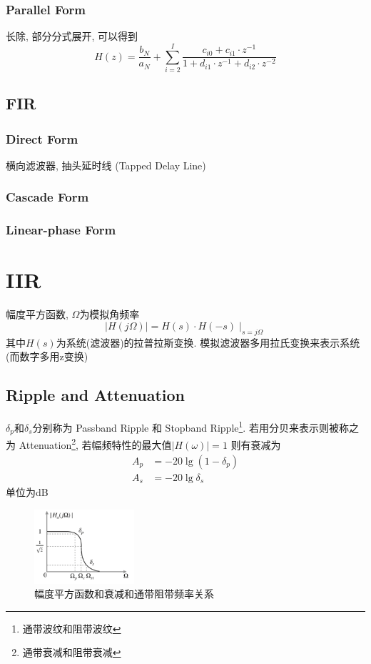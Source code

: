 \documentclass[a4paper]{report}
\begin{document}
\subsection{Parallel Form}
长除, 部分分式展开, 可以得到
\begin{equation}
  H(z)=\frac{b_N}{a_N}+\displaystyle\sum_{i=2}^{I}\frac{c_{i0}+c_{i1}\cdot z^{-1}}{1+d_{i1}\cdot z^{-1}+d_{i2}\cdot z^{-2}}
\end{equation}
\section{FIR}
\subsection{Direct Form}
横向滤波器, 抽头延时线 (Tapped Delay Line)
\subsection{Cascade Form}
\subsection{Linear-phase Form}



\chapter{IIR}
幅度平方函数, $\Omega$为模拟角频率
\begin{equation}
  \lvert H(j\Omega)\rvert=H(s)\cdot H(-s)\mid_{s=j\Omega}
\end{equation}
其中$H(s)$为系统(滤波器)的拉普拉斯变换. 模拟滤波器多用拉氏变换来表示系统(而数字多用z变换)

\section{Ripple and Attenuation}
$\delta_p$和$\delta_s$分别称为 Passband Ripple 和 Stopband Ripple\footnote{通带波纹和阻带波纹}. 若用分贝来表示则被称之为 Attenuation\footnote{通带衰减和阻带衰减}, 若幅频特性的最大值$\lvert H(\omega)\rvert=1$ 则有衰减为
\begin{align}
  A_p&=-20\lg{(1-\delta_p)}
  \\   A_s&=-20\lg{\delta_s}
\end{align}
单位为dB
\begin{figure}[H]
\centering
\includegraphics[width=0.33\textwidth]{filter_amp_square.png}
\caption{幅度平方函数和衰减和通带阻带频率关系}
\end{figure}
\end{document}
